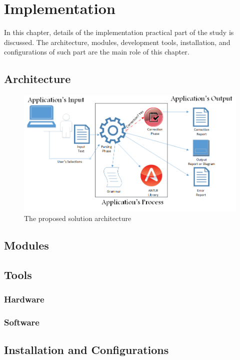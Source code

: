 \chapter{Implementation}
\label{ch:implementation}
\newpage

In this chapter, details of the implementation practical part of the study is discussed. The architecture, modules, development tools, installation, and configurations of such part are the main role of this chapter.    
\section {Architecture}
	\begin{figure}[ht]
	\begin{center}
		\includegraphics[scale=0.6,angle=0]{images/Architecture}
		\caption{The proposed solution architecture}
		\label{Fig:Architecture}
	\end{center}
\end{figure}
\section {Modules} 
\section{Tools}
\subsection{Hardware}
\subsection{Software}

\section{Installation and Configurations}












